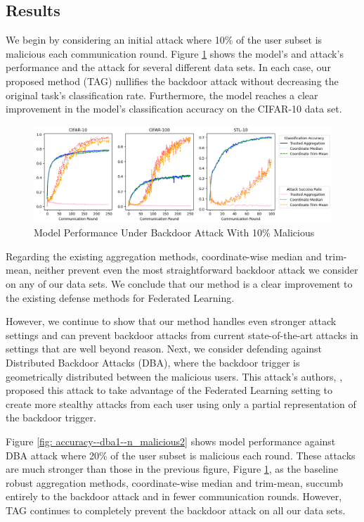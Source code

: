 \documentclass{article} %
\begin{document}
%
\subsection{Results}

We begin by considering an initial attack where 10\% of the user subset is malicious each communication round. Figure \ref{fig: accuracy--n_malicious1} shows the model's and attack's performance and the attack for several different data sets. In each case, our proposed method (TAG) nullifies the backdoor attack without decreasing the original task's classification rate. Furthermore, the model reaches a clear improvement in the model's classification accuracy on the CIFAR-10 data set.

\begin{figure}[H]
    \centering
    \includegraphics[width=\textwidth]{make_article/make_visuals/visuals/accuracy--n_malicious1--dba0--beta0.2.png}
    \caption{Model Performance Under Backdoor Attack With 10\% Malicious}
    \label{fig: accuracy--n_malicious1}
\end{figure}

Regarding the existing aggregation methods, coordinate-wise median and trim-mean, neither prevent even the most straightforward backdoor attack we consider on any of our data sets. We conclude that our method is a clear improvement to the existing defense methods for Federated Learning. 

However, we continue to show that our method handles even stronger attack settings and can prevent backdoor attacks from current state-of-the-art attacks in settings that are well beyond reason. Next, we consider defending against Distributed Backdoor Attacks (DBA), where the backdoor trigger is geometrically distributed between the malicious users. This attack's authors, \cite{dba}, proposed this attack to take advantage of the Federated Learning setting to create more stealthy attacks from each user using only a partial representation of the backdoor trigger. 

Figure \ref{fig: accuracy--dba1--n_malicious2} shows model performance against DBA attack where 20\% of the user subset is malicious each round. These attacks are much stronger than those in the previous figure, Figure \ref{fig: accuracy--n_malicious1}, as the baseline robust aggregation methods, coordinate-wise median and trim-mean, succumb entirely to the backdoor attack and in fewer communication rounds. However, TAG continues to completely prevent the backdoor attack on all our data sets.
\end{document}

